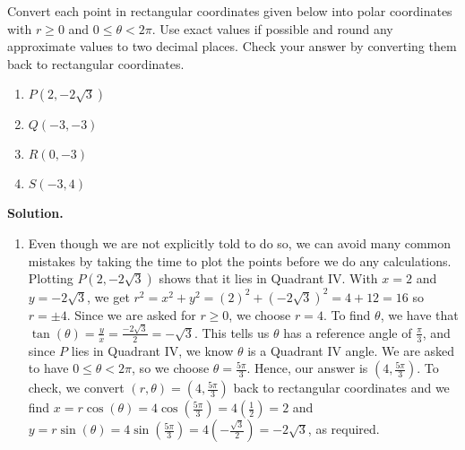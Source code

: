 \begin{ex}  \label{pointconversionex}   Convert each point in rectangular coordinates given below into polar coordinates with $r \geq 0$ and $0 \leq \theta < 2\pi$.  Use exact values if possible and round any approximate values to two decimal places.  Check your answer by converting them back to rectangular coordinates.

\begin{multicols}{4}

\begin{enumerate}

\item  $P\left(2,-2\sqrt{3}\right)$

\item  $Q(-3,-3)$

\item  $R(0,-3)$

\item  $S(-3,4)$

\end{enumerate}

\end{multicols}

\pagebreak

{\bf Solution.}

\begin{enumerate}

\item  Even though we are not explicitly told to do so, we can avoid many common mistakes by taking the time to plot the points before we do any calculations.  Plotting $P\left(2,-2\sqrt{3}\right)$ shows that it lies in Quadrant IV.  With $x = 2$ and $y = -2\sqrt{3}$, we get $r^2 = x^2 + y^2 = (2)^2 + \left(-2\sqrt{3}\right)^2 = 4+12 = 16$ so $r = \pm 4$.  Since we are asked for $r \geq 0$, we choose $r = 4$.  To find $\theta$, we have that $\tan(\theta) = \frac{y}{x} = \frac{-2\sqrt{3}}{2} = -\sqrt{3}$.  This tells us $\theta$ has a reference angle of $\frac{\pi}{3}$, and  since $P$ lies in Quadrant IV, we know $\theta$ is a Quadrant IV angle.   We are asked to have $0 \leq \theta < 2\pi$, so we choose $\theta = \frac{5\pi}{3}$.  Hence, our answer is  $\left(4, \frac{5\pi}{3}\right)$.  To check, we convert $(r,\theta) = \left(4, \frac{5\pi}{3}\right)$ back to rectangular coordinates and we find $x = r \cos(\theta) = 4 \cos\left(\frac{5\pi}{3}\right) = 4 \left(\frac{1}{2}\right) =  2$ and  $y = r \sin(\theta) = 4 \sin\left(\frac{5\pi}{3}\right) = 4 \left(-\frac{\sqrt{3}}{2}\right) = -2\sqrt{3}$, as required.


\end{enumerate}
\end{ex}
